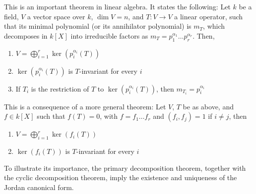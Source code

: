 \documentclass[12pt]{article}
\begin{document}
This is an important theorem in linear algebra. It states the following:
Let $k$ be a field, $V$ a vector space over $k$, $\dim V =n$, and $T\colon V\to V$ a linear operator, such that its minimal polynomial (or its annihilator polynomial) is $m_{T}$, which decomposes in $k[X]$ into irreducible factors as $m_{T}=p_{1}^{\alpha_{1}} \ldots p_{r}^{\alpha_{r}}$. Then,
\begin{enumerate}
\item  $V=\bigoplus_{i=1}^{r}\ker (p_{i}^{\alpha_{i}}(T))$
\item $\ker (p_{i}^{\alpha_{i}}(T))$ is $T$-invariant for every $i$
\item If $T_{i}$ is the restriction of $T$ to $\ker (p_{i}^{\alpha_{i}}(T))$, then $m_{T_{i}}=p_{i}^{\alpha_{i}}$
\end{enumerate}

This is a consequence of a more general theorem:
Let $V$, $T$ be as above, and $f \in k[X]$ such that $f(T)=0$, with $f=f_{1} \ldots f_{r}$ and $(f_{i},f_{j})=1$ if $i \neq j$, then
\begin{enumerate}
\item $V=\bigoplus _{i=1}^{r}\ker(f_{i}(T))$
\item $\ker(f_{i}(T))$ is $T$-invariant for every $i$
\end{enumerate}

To illustrate its importance, the primary decomposition theorem, together with the cyclic decomposition theorem, imply the existence and uniqueness of the Jordan canonical form.
\end{document}
